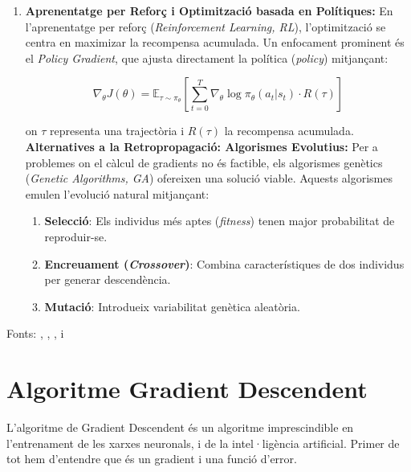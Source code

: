 \begin{enumerate}
\begin{enumerate}
            \item \textbf{Aprenentatge per Reforç i Optimització basada en Polítiques:} En l'aprenentatge per reforç (\textit{Reinforcement Learning, RL}), l'optimització se centra en maximizar la recompensa acumulada. Un enfocament prominent és el \textit{Policy Gradient}, que ajusta directament la política (\textit{policy}) mitjançant:

           $$ \nabla_\theta J(\theta) = \mathbb{E}_{\tau \sim \pi_\theta} \left[ \sum_{t=0}^T \nabla_\theta \log \pi_\theta(a_t|s_t) \cdot R(\tau) \right] $$

           on $\tau$ representa una trajectòria i $R(\tau)$ la recompensa acumulada.\\

           \textbf{Alternatives a la Retropropagació: Algorismes Evolutius:} Per a problemes on el càlcul de gradients no és factible, els algorismes genètics (\textit{Genetic Algorithms, GA}) ofereixen una solució viable. Aquests algorismes emulen l'evolució natural mitjançant:

               \begin{enumerate}

                \item \textbf{Selecció}: Els individus més aptes (\textit{fitness}) tenen major probabilitat de reproduir-se.

                \item \textbf{Encreuament (\textit{Crossover})}: Combina característiques de dos individus per generar descendència.

                \item \textbf{Mutació}: Introdueix variabilitat genètica aleatòria.

               \end{enumerate}

    \end{enumerate}


\end{enumerate}

Fonts: \cite{Rumelhart1986}, \cite{NIPS2014_f033ed80}, \cite{kingma2022autoencodingvariationalbayes}, \cite{NIPS1999_464d828b} i \cite{Holland:1975}

\section{Algoritme Gradient Descendent}\label{Algoritme_gradient}
   L'algoritme de Gradient Descendent és un algoritme imprescindible en l'entrenament de les xarxes neuronals, i de la intel·ligència artificial. Primer de tot hem d'entendre que és un gradient i una funció d'error.

